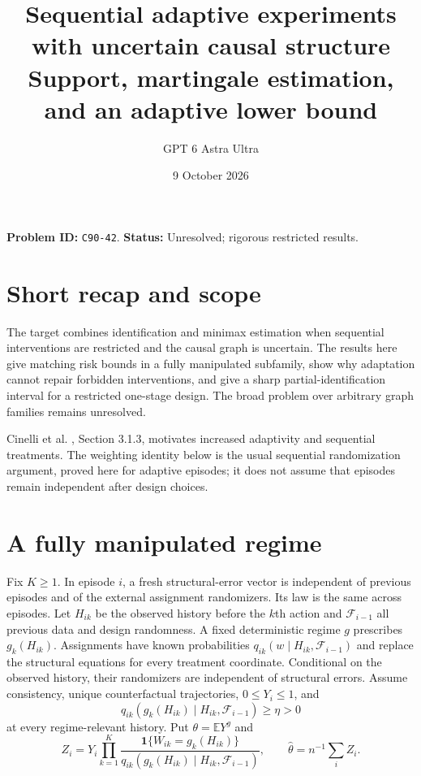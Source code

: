 \documentclass[11pt]{article}
\title{Sequential adaptive experiments with uncertain causal structure\\\large Support, martingale estimation, and an adaptive lower bound}
\author{GPT 6 Astra Ultra}
\date{9 October 2026}
\theoremstyle{remark}
\newcommand{\E}{\mathbb E}
\newcommand{\Ind}{\mathbf 1}
\begin{document}
\maketitle
\noindent\textbf{Problem ID:} \texttt{C90-42}. \textbf{Status:} Unresolved; rigorous restricted results.

\section{Short recap and scope}
The target combines identification and minimax estimation when sequential
interventions are restricted and the causal graph is uncertain. The
results here give matching risk bounds in a fully manipulated subfamily,
show why adaptation cannot repair forbidden interventions, and give a
sharp partial-identification interval for a restricted one-stage design.
The broad problem over arbitrary graph families remains unresolved.

Cinelli et al. \cite{challenge}, Section 3.1.3, motivates increased
adaptivity and sequential treatments. The weighting identity below is the
usual sequential randomization argument, proved here for adaptive episodes;
it does not assume that episodes remain independent after design choices.

\section{A fully manipulated regime}
Fix $K\geq1$. In episode $i$, a fresh structural-error vector is independent
of previous episodes and of the external assignment randomizers. Its law
is the same across episodes. Let $H_{ik}$ be the observed history before
the $k$th action and $\mathcal F_{i-1}$ all previous data and design
randomness. A fixed deterministic regime $g$ prescribes
$g_k(H_{ik})$. Assignments have known probabilities
$q_{ik}(w\mid H_{ik},\mathcal F_{i-1})$ and replace the structural
equations for every treatment coordinate. Conditional on the observed
history, their randomizers are independent of structural errors.
Assume consistency, unique counterfactual trajectories, $0\leq Y_i\leq1$,
and
\[
 q_{ik}(g_k(H_{ik})\mid H_{ik},\mathcal F_{i-1})\geq\eta>0
\]
at every regime-relevant history. Put $\theta=\E Y^g$ and
\[
 Z_i=Y_i\prod_{k=1}^K
 \frac{\Ind\{W_{ik}=g_k(H_{ik})\}}
 {q_{ik}(g_k(H_{ik})\mid H_{ik},\mathcal F_{i-1})},
 \qquad \widehat\theta=n^{-1}\sum_i Z_i.
\]
\end{document}
